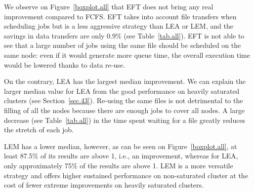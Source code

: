 \documentclass[conference]{IEEEtran}
\begin{document}
We observe on Figure~\ref{boxplot.all} that EFT does not bring any real improvement compared to FCFS.
EFT takes into account file transfers when scheduling jobs but is a less aggressive strategy than LEA or LEM, and the savings in data transfers are only 0.9\% (see Table~\ref{tab.all}).
EFT is not able to see that a large number of jobs using the same file
should be scheduled on the same node: even if it would generate more
queue time, the overall execution time would be lowered thanks to data re-use.

\begin{table}
\end{table}

On the contrary, LEA has the largest median improvement.
We can explain the larger median value for LEA from the good performance on heavily saturated clusters (see Section~\ref{sec.43}).
Re-using the same files is not detrimental to the filling of all the nodes because there are enough jobs to cover all nodes.
A large decrease (see Table~\ref{tab.all}) in the time spent waiting for a file greatly reduces the stretch of each job.

LEM has a lower median,
however, as can be seen on Figure~\ref{boxplot.all}, at least 87.5\% of its results are above 1, i.e., an improvement, whereas for LEA, only approximately 75\% of the results are above 1. 
LEM is a more versatile strategy and offers higher sustained performance on non-saturated cluster at the cost
of fewer extreme improvements on heavily saturated clusters.

\begin{table}
\end{table}
\end{document}
